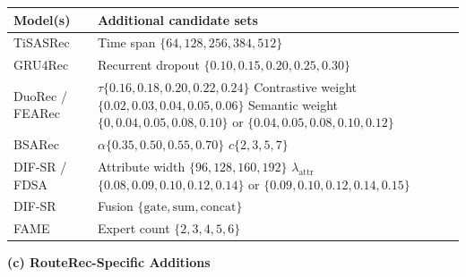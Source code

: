 \documentclass[sigconf,review,anonymous]{acmart}
\begin{document}
\begin{table}[!t]
\begin{minipage}[t]{0.42\textwidth}
    \vspace{0.25em}
    \scriptsize
    \setlength{\tabcolsep}{4pt}
    \renewcommand{\arraystretch}{1.03}
    \begin{tabularx}{\linewidth}{@{}lX@{}}
      \toprule
      Model(s) & Additional candidate sets \\
      \midrule
      TiSASRec & Time span $\{64,128,256,384,512\}$ \\
      GRU4Rec & Recurrent dropout $\{0.10,0.15,0.20,0.25,0.30\}$ \\
      DuoRec / FEARec & $\tau\{0.16,0.18,0.20,0.22,0.24\}$\newline
      Contrastive weight $\{0.02,0.03,0.04,0.05,0.06\}$\newline
      Semantic weight $\{0,0.04,0.05,0.08,0.10\}$ or $\{0.04,0.05,0.08,0.10,0.12\}$ \\
      BSARec & $\alpha\{0.35,0.50,0.55,0.70\}$\newline
      $c\{2,3,5,7\}$ \\
      DIF-SR / FDSA & Attribute width $\{96,128,160,192\}$\newline
      $\lambda_{\mathrm{attr}}$ $\{0.08,0.09,0.10,0.12,0.14\}$ or $\{0.09,0.10,0.12,0.14,0.15\}$ \\
      DIF-SR & Fusion $\{\mathrm{gate},\mathrm{sum},\mathrm{concat}\}$ \\
      FAME & Expert count $\{2,3,4,5,6\}$ \\
      \bottomrule
    \end{tabularx}
  \end{minipage}

  \vspace{0.75em}

  \begin{minipage}[t]{0.50\textwidth}
    \textbf{(c) RouteRec-Specific Additions}


\end{minipage}
\end{table}
\end{document}

